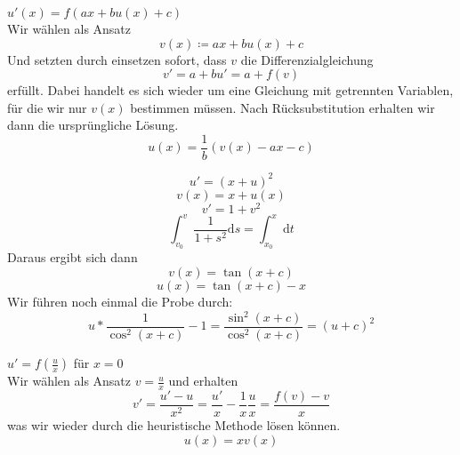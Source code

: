 \item[iv)] $u'(x)=f(ax+bu(x)+c)$\\ \linebreak
Wir wählen als Ansatz 
\begin{equation*}
v(x)\coloneqq ax+bu(x)+c
\end{equation*}
Und setzten durch einsetzen sofort, dass $v$ die 
Differenzialgleichung 
\begin{equation*}
v'=a+bu'=a+f(v)
\end{equation*}
erfüllt. Dabei handelt es sich wieder um eine Gleichung mit 
getrennten Variablen, für die wir nur $v(x)$ bestimmen müssen. 
Nach Rücksubstitution erhalten wir dann die ursprüngliche 
Lösung.
\begin{equation*}
u(x)=\frac{1}{b}\left(v(x)-ax-c\right)
\end{equation*}

\begin{beispiel*}
\begin{equation*}
u'=(x+u)^2
\end{equation*}
\begin{equation*}
v(x)=x+u(x)
\end{equation*}
\begin{equation*}
v'=1+v^2
\end{equation*}
\begin{equation*}
\int_{v_0}^v\frac{1}{1+s^2}\mathrm{d}s = 
\int_{x_0}^x\mathrm{d}t
\end{equation*}
Daraus ergibt sich dann
\begin{equation*}
	v(x)=\tan(x+c)
\end{equation*}
\begin{equation*}
u(x)=\tan(x+c)-x
\end{equation*}
Wir führen noch einmal die Probe durch:
\begin{equation*}
u*\frac{1}{\cos^2(x+c)}-1=\frac{\sin^2(x+c)}{\cos^2(x+c)} = 
(u+c)^2
\end{equation*}
\end{beispiel*}


\item[v)] $u'=f\left(\frac{u}{x}\right)$ für $x=0$\\
\linebreak
Wir wählen als Ansatz $v=\frac{u}{x}$ und erhalten
\begin{equation*}
v'=\frac{u'-u}{x^2}=\frac{u'}{x}-\frac{1}{x}\frac{u}{x} = 
\frac{f(v)-v}{x}
\end{equation*}
was wir wieder durch die heuristische Methode lösen können.
\begin{equation*}
u(x)=xv(x)
\end{equation*}

